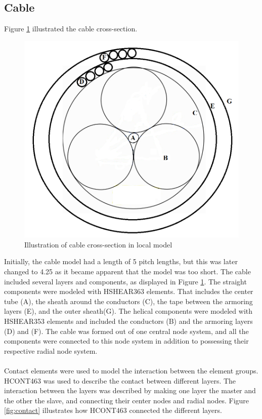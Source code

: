 \subsection{Cable}
 Figure \ref{fig:crosspro} illustrated the cable cross-section.
\begin{figure}[H]
\centering
\includegraphics[scale=0.8]{figures/cross2}
\caption [$\; \:$Cable cross-section in the local model]{Illustration of cable cross-section in local model}
 \label{fig:crosspro}
\end{figure}
Initially, the cable model had a length of 5 pitch lengths, but this was later changed to 4.25 as it became apparent that the model was too short. The cable included several layers and components, as displayed in Figure \ref{fig:crosspro}.  The straight components were modeled with HSHEAR363 elements. That includes the center tube (A), the sheath around the conductors (C), the tape between the armoring layers (E), and the outer sheath(G). The helical components were modeled with HSHEAR353 elements and included the conductors (B) and the armoring layers (D) and (F). The cable was formed out of one central node system, and all the components were connected to this node system in addition to possessing their respective radial node system.\\\\ Contact elements were used to model the interaction between the element groups. HCONT463 was used to describe the contact between different layers. The interaction between the layers was described by making one layer the master and the other the slave, and connecting their center nodes and radial nodes.  Figure \ref{fig:contact} illustrates how HCONT463 connected the different layers.

